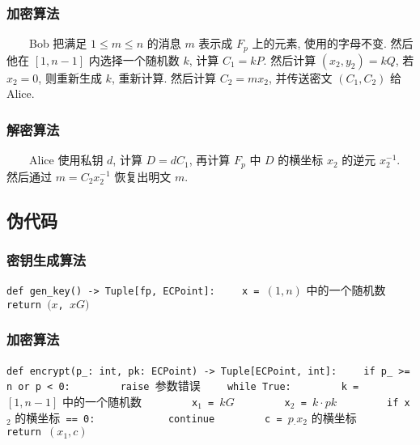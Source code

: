 \documentclass[12pt,a4paper]{article}
\begin{document}
\subsubsection*{加密算法}

　　Bob 把满足 $ 1 \le m \le n $ 的消息 $ m $ 表示成 $ F_p $ 上的元素, 使用的字母不变. 然后他在 $ [1, n - 1] $ 内选择一个随机数 $ k $, 计算 $ C_1 = k P $. 然后计算 $ (x_2, y_2) = k Q $, 若 $ x_2 = 0 $, 则重新生成 $ k $, 重新计算. 然后计算 $ C_2 = m x_2 $, 并传送密文 $ (C_1, C_2) $ 给 Alice.

\subsubsection*{解密算法}

　　Alice 使用私钥 $ d $, 计算 $ D = d C_1 $, 再计算 $ F_p $ 中 $ D $ 的横坐标 $ x_2 $ 的逆元 $ x_2^{-1} $. 然后通过 $ m = C_2 x_2^{-1} $ 恢复出明文 $ m $. 

\subsection*{伪代码}

\subsubsection*{密钥生成算法}

\lstinline{def gen_key() -> Tuple[fp, ECPoint]:}
\newline
\lstinline{    x = }$ (1, n) $ 中的一个随机数
\newline
\lstinline{    return }$ (x $\lstinline{, }$ x G) $

\subsubsection*{加密算法}

\lstinline{def encrypt(p_: int, pk: ECPoint) -> Tuple[ECPoint, int]:}
\newline
\lstinline{    if p_ >= n or p < 0:}
\newline
\lstinline{        raise }参数错误
\newline
\lstinline{    while True:}
\newline
\lstinline{        k = }$ [1, n - 1] $ 中的一个随机数
\newline
\lstinline{        x}$_1$\lstinline{ = }$ k G $
\newline
\lstinline{        x}$_2$\lstinline{ = }$ k \cdot pk $
\newline
\lstinline{        if x}$_2$ 的横坐标\lstinline{ == 0:}
\newline
\lstinline{            continue}
\newline
\lstinline{        c = }$ p_ \cdot x_2 $ 的横坐标
\newline
\lstinline{      return }$ (x_1, c) $
\end{document}
